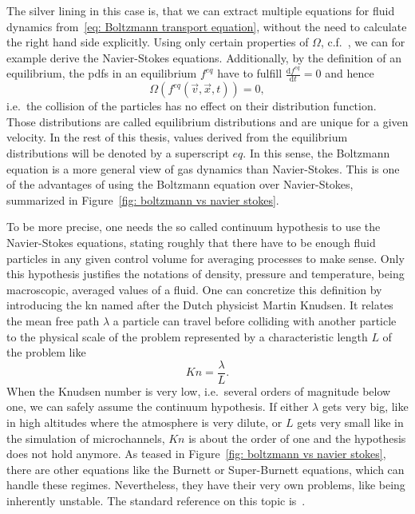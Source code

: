 The silver lining in this case is, that we can extract multiple equations for fluid dynamics from~\eqref{eq: Boltzmann transport equation}, without the need to calculate the right hand side explicitly.
Using only certain properties of $\Omega$, c.f.~\cite[Pages 26 ff.]{harris2004introduction}, we can for example derive the Navier-Stokes equations.
Additionally, by the definition of an equilibrium, the \glspl{pdf} in an equilibrium $f^{eq}$ have to fulfill $\frac{\text{d}f^{eq}}{\text{d}t}=0$ and hence
\begin{equation}
  \Omega(f^{eq}(\vec{v},\vec{x},t)) = 0,
\end{equation}
i.e.\ the collision of the particles has no effect on their distribution function.
Those distributions are called equilibrium distributions and are unique for a given velocity.
In the rest of this thesis, values derived from the equilibrium distributions will be denoted by a superscript $eq$.
In this sense, the Boltzmann equation is a more general view of gas dynamics than Navier-Stokes.
This is one of the advantages of using the Boltzmann equation over Navier-Stokes, summarized in Figure~\ref{fig: boltzmann vs navier stokes}.

To be more precise, one needs the so called continuum hypothesis to use the Navier-Stokes equations, stating roughly that there have to be enough fluid particles in any given control volume for averaging processes to make sense.
Only this hypothesis justifies the notations of density, pressure and temperature, being macroscopic, averaged values of a fluid.
One can concretize this definition by introducing the \gls{kn} named after the Dutch physicist Martin Knudsen.
It relates the mean free path $\lambda$ a particle can travel before colliding with another particle to the physical scale of the problem represented by a characteristic length $L$ of the problem like
\begin{equation}
  \label{eq: definition of knudsen number}
  Kn=\frac{\lambda}{L}.
\end{equation}
When the Knudsen number is very low, i.e.\ several orders of magnitude below one, we can safely assume the continuum hypothesis.
If either $\lambda$ gets very big, like in high altitudes where the atmosphere is very dilute, or $L$ gets very small like in the simulation of microchannels, $Kn$ is about the order of one and the hypothesis does not hold anymore.
As teased in Figure~\ref{fig: boltzmann vs navier stokes}, there are other equations like the Burnett or Super-Burnett equations, which can handle these regimes.
Nevertheless, they have their very own problems, like being inherently unstable.
The standard reference on this topic is~\cite{agarwal2001beyond}.
